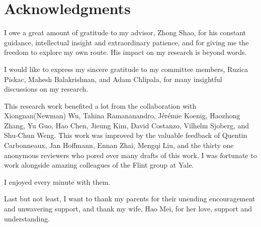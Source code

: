 

\chapter*{Acknowledgments}
\thispagestyle{empty}

I owe a great amount of gratitude to my advisor, Zhong Shao, for
his constant guidance, intellectual insight and extraordinary patience,
and for giving me the freedom to explore my own route.
His impact on my research is beyond words.

I would like to express my sincere gratitude to my committee members,
Ruzica Piskac, Mahesh Balakrishnan, and Adam Chlipala, for many insightful
discussions on my research.

This research work benefited a lot from 
the collaboration with Xiongnan(Newman) Wu,
Tahina Ramananandro,
J\'{e}r\'{e}mie Koenig,
Haozhong Zhang,
Yu Guo,
Hao Chen,
Jieung Kim,
David Costanzo,
Vilhelm Sjoberg,
and Shu-Chun Weng.
This work was improved by the valuable feedback of 
Quentin Carbonneaux,
Jan Hoffmann,
Ennan Zhai, Mengqi Liu,
and the thirty one anonymous reviewers who pored over many drafts
of this work.
I was fortunate to work alongside 
amazing colleagues of the Flint group at Yale. 
I enjoyed every minute with them.

Last but not least, I want to thank my parents 
for their unending encouragement and unwavering support, 
and thank my wife, Hao Mei,
for her love, support and understanding.

\clearpage
